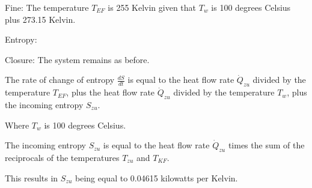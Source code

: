Fine: The temperature \( T_{EF} \) is 255 Kelvin given that \( T_w \) is 100 degrees Celsius plus 273.15 Kelvin.

Entropy:

Closure: The system remains as before.

The rate of change of entropy \( \frac{dS}{dt} \) is equal to the heat flow rate \( \dot{Q}_{zu} \) divided by the temperature \( T_{EF} \), plus the heat flow rate \( \dot{Q}_{zu} \) divided by the temperature \( T_w \), plus the incoming entropy \( S_{zu} \).

Where \( T_w \) is 100 degrees Celsius.

The incoming entropy \( S_{zu} \) is equal to the heat flow rate \( \dot{Q}_{zu} \) times the sum of the reciprocals of the temperatures \( T_{zu} \) and \( T_{KF} \).

This results in \( S_{zu} \) being equal to 0.04615 kilowatts per Kelvin.